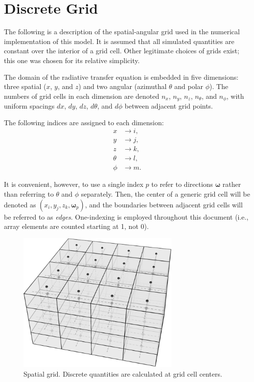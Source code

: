 \documentclass[ms,cpyr,lof,lot]{uathesis}
\renewcommand\vec\bm
\begin{document}
\section{Discrete Grid}
\label{sec:grid}

The following is a description of the spatial-angular grid used in the numerical implementation of this model.
It is assumed that all simulated quantities are constant over the interior of a grid cell.
Other legitimate choices of grids exist; this one was chosen for its relative simplicity.

The domain of the radiative transfer equation is embedded in five dimensions: three spatial ($x$, $y$, and $z$) and two angular (azimuthal $\theta$ and polar $\phi$).
The numbers of grid cells in each dimension are denoted $n_x$, $n_y$, $n_z$,
$n_\theta$, and $n_\phi$, with uniform spacings $dx$, $dy$, $dz$, $d\theta$, and
$d\phi$ between adjacent grid points.

The following indices are assigned to each dimension:
\begin{align*}
  x &\to i, \\
  y &\to j, \\
  z &\to k, \\
  \theta &\to l, \\
  \phi &\to m.
\end{align*}

It is convenient, however, to use a single index $p$ to refer to directions $\vec{\omega}$ rather than referring to $\theta$ and $\phi$ separately.
Then, the center of a generic grid cell will be denoted as
$(x_i, y_j, z_k, \vec{\omega}_p)$, and the boundaries between adjacent grid cells
will be referred to as \textit{edges}.
One-indexing is employed throughout this document (i.e., array elements are counted starting at 1, not 0).

\begin{figure}[H]
  \centering
  \includegraphics[width=8cm]{spatialgrid.pdf}
  \caption{Spatial grid. Discrete quantities are calculated at grid cell centers.}
  \label{fig:spatial_grid}
\end{figure}
\end{document}
